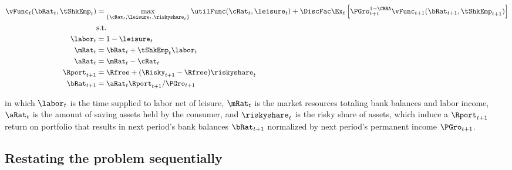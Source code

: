 \documentclass[\econtexRoot/SequentialEGM]{subfiles}
\begin{document}
\begin{equation}
    \begin{split}
        \vFunc_{t}(\bRat_{t}, \tShkEmp_{t}) & = \max_{\{\cRat_{t},
            \leisure_{t}, \riskyshare_{t}\}} \utilFunc(\cRat_{t}, \leisure_{t}) +
        \DiscFac \Ex_{t} \left[ \PGro_{t+1}^{1-\CRRA}
            \vFunc_{t+1} (\bRat_{t+1},
            \tShkEmp_{t+1}) \right] \\
        & \text{s.t.} \\
        \labor_{t} & = 1 - \leisure_{t} \\
        \mRat_{t} & = \bRat_{t} + \tShkEmp_{t}\labor_{t} \\
        \aRat_{t} & = \mRat_{t} - \cRat_{t} \\
        \Rport_{t+1} & = \Rfree + (\Risky_{t+1} - \Rfree)
        \riskyshare_{t} \\
        \bRat_{t+1} & = \aRat_{t} \Rport_{t+1} / \PGro_{t+1}
    \end{split}
\end{equation}

in which $\labor_{t}$ is the time supplied to labor net of leisure, $\mRat_{t}$ is the market resources totaling bank balances and labor income, $\aRat_{t}$ is the amount of saving assets held by the consumer, and $\riskyshare_{t}$ is the risky share of assets, which induce a $\Rport_{t+1}$ return on portfolio that results in next period's bank balances $\bRat_{t+1}$ normalized by next period's permanent income $\PGro_{t+1}$.


\subsection{Restating the problem sequentially}
\end{document}
